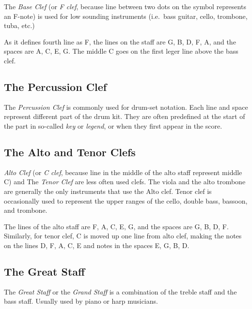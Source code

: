 The \textit{Base Clef} (or \textit{F clef}, because line between two dots on the symbol represents an F-note) is used for
low sounding instruments (i.e.\ bass guitar, cello, trombone, tuba, etc.)

\figcenter{}

As it defines fourth line as F, the lines on the staff are G, B, D, F, A, and the spaces are A, C, E, G\@. The middle C
goes on the first leger line above the bass clef.


\subsection{The Percussion Clef}\label{subsec:the-percussion-clef}

The \textit{Percussion Clef} is commonly used for drum-set notation. Each line and space represent different part of
the drum kit. They are often predefined at the start of the part in so-called \textit{key} or \textit{legend}, or when
they first appear in the score.

\figcenter{}


\subsection{The Alto and Tenor Clefs}\label{subsec:the-alto-and-tenor-clefs}

\textit{Alto Clef} (or \textit{C clef}, because line in the middle of the alto staff represent middle C) and
The \textit{Tenor Clef} are less often used clefs. The viola and the alto trombone are generally the only instruments that
use the Alto clef. Tenor clef is occasionally used to represent the upper ranges of the cello, double bass, bassoon,
and trombone.

\figcenter{}

The lines of the alto staff are F, A, C, E, G, and the spaces are G, B, D, F\@. Similarly, for tenor clef, C is moved up
one line from alto clef, making the notes on the lines D, F, A, C, E and notes in the spaces E, G, B, D\@.

\subsection{The Great Staff}\label{subsec:the-great-staff}
The \textit{Great Staff} or the \textit{Grand Staff} is a combination of the treble staff and the bass staff. Usually
used by piano or harp musicians.

